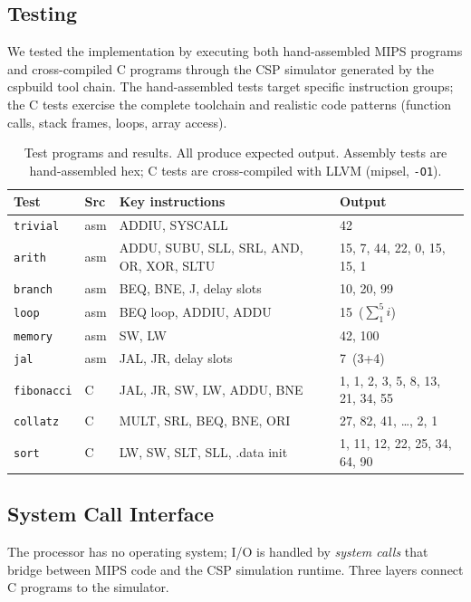 \documentclass[11pt]{article}
\begin{document}
\subsection{Testing}

We tested the implementation by executing both hand-assembled MIPS programs
and cross-compiled C programs through the CSP simulator generated by the
cspbuild tool chain.  The hand-assembled tests target specific instruction
groups; the C tests exercise the complete toolchain and realistic code patterns
(function calls, stack frames, loops, array access).

\begin{table}[ht]
\centering\small
\begin{tabular}{@{}llp{3.2cm}l@{}}
\toprule
Test & Src & Key instructions & Output \\
\midrule
\texttt{trivial}   & asm & ADDIU, SYSCALL & 42 \\
\texttt{arith}     & asm & ADDU, SUBU, SLL, SRL, AND, OR, XOR, SLTU &
  15, 7, 44, 22, 0, 15, 15, 1 \\
\texttt{branch}    & asm & BEQ, BNE, J, delay slots & 10, 20, 99 \\
\texttt{loop}      & asm & BEQ loop, ADDIU, ADDU & 15\, ($\sum_{1}^{5} i$) \\
\texttt{memory}    & asm & SW, LW & 42, 100 \\
\texttt{jal}       & asm & JAL, JR, delay slots & 7\, (3+4) \\
\midrule
\texttt{fibonacci} & C & JAL, JR, SW, LW, ADDU, BNE &
  1, 1, 2, 3, 5, 8, 13, 21, 34, 55 \\
\texttt{collatz}   & C & MULT, SRL, BEQ, BNE, ORI &
  27, 82, 41, \ldots, 2, 1 \\
\texttt{sort}      & C & LW, SW, SLT, SLL, .data init &
  1, 11, 12, 22, 25, 34, 64, 90 \\
\bottomrule
\end{tabular}
\caption{Test programs and results.  All produce expected output.
  Assembly tests are hand-assembled hex; C tests are cross-compiled
  with LLVM (mipsel, \texttt{-O1}).}
\label{tab:tests}
\end{table}

\subsection{System Call Interface}

The processor has no operating system; I/O is handled by \emph{system calls}
that bridge between MIPS code and the CSP simulation runtime.  Three layers
connect C programs to the simulator.
\end{document}
